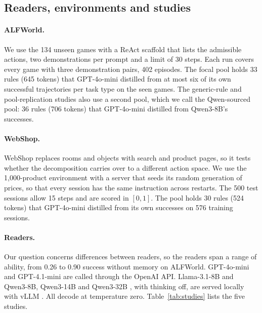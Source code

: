 \subsection{Readers, environments and studies}
\label{sec:setup}

\paragraph{ALFWorld.} We use the 134 unseen games with a ReAct scaffold \citep{yao2023react} that lists
the admissible actions, two demonstrations per prompt and a limit of 30 steps. Each run covers every
game with three demonstration pairs, 402 episodes. The focal pool holds 33 rules (645 tokens) that
GPT-4o-mini distilled from at most six of its own successful trajectories per task type on the seen
games. The generic-rule and pool-replication studies also use a second pool, which we call the
Qwen-sourced pool: 36 rules (706 tokens) that GPT-4o-mini distilled from Qwen3-8B's successes.

\paragraph{WebShop.} WebShop replaces rooms and objects with search and product pages, so it tests whether
the decomposition carries over to a different action space. We use the 1,000-product environment with a server that seeds its random
generation of prices, so that every session has the same instruction across restarts. The 500 test
sessions allow 15 steps and are scored in $[0,1]$. The pool holds 30 rules (524 tokens) that
GPT-4o-mini distilled from its own successes on 576 training sessions.

\paragraph{Readers.} Our question concerns differences between readers, so the readers span a range of
ability, from 0.26 to 0.90 success without memory on ALFWorld. GPT-4o-mini and GPT-4.1-mini are called
through the OpenAI API. Llama-3.1-8B
\citep{grattafiori2024llama3} and Qwen3-8B, Qwen3-14B and Qwen3-32B \citep{yang2025qwen3}, with
thinking off, are served locally with vLLM \citep{kwon2023vllm}. All decode at temperature zero.
Table~\ref{tab:studies} lists the five studies.


